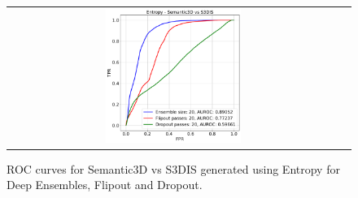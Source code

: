\begin{figure}
\begin{tabular}{cc}
            \includegraphics[width = 0.42\textwidth, height= 0.3\textheight]{images/AUROC/Entropy_20.pdf} &
            \\
        \end{tabular}
        \caption{ROC curves for Semantic3D vs S3DIS generated using Entropy for Deep Ensembles, Flipout and Dropout.}
        \label{fig:roc_ent_ood_1}
    \end{figure}

